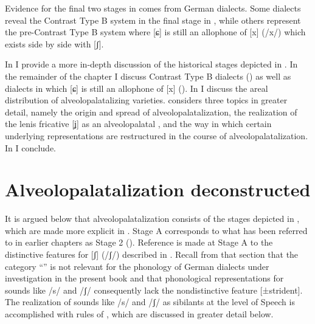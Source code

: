 Evidence for the final two stages in  comes from German dialects. Some dialects reveal the Contrast Type B system in the final stage in , while others represent the pre-Contrast Type B system where [ɕ] is still an allophone of [x] (/x/) which exists side by side with [ʃ].

In  I provide a more in-depth discussion of the historical stages depicted in . In the remainder of the chapter I discuss Contrast Type B dialects () as well as dialects in which [ɕ] is still an allophone of [x] (). In  I discuss the areal distribution of alveolopalatalizing varieties.  considers three topics in greater detail, namely the origin and spread of alveolopalatalization, the realization of the lenis fricative [ʝ] as an alveolopalatal , and the way in which certain underlying representations are restructured in the course of alveolopalatalization.  In  I conclude.

\section{{Alveolopalatalization} {deconstructed}}\label{sec:10.2}

It is argued below that alveolopalatalization consists of the stages depicted in , which are made more explicit in . Stage A corresponds to what has been referred to in earlier chapters as Stage 2 (). Reference is made at Stage A to the distinctive features for [ʃ] (/ʃ/) described in . Recall from that section that the category “” is not relevant for the phonology of German dialects under investigation in the present book and that phonological representations for sounds like /s/ and /ʃ/ consequently lack the nondistinctive feature [±strident]. The realization of sounds like /s/ and /ʃ/ as sibilants at the level of Speech is accomplished with rules of , which are discussed in greater detail below.

